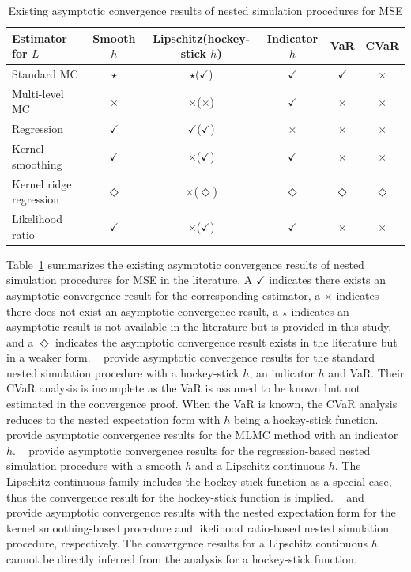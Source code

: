\begin{table}[ht]
    \centering
    \footnotesize
    \begin{tabular}{|l|c|c|c|c|c|}
    \hline
    \textbf{Estimator for} $L$ & \textbf{Smooth} $h$ & \textbf{Lipschitz}(\textbf{hockey-stick} $h$) & \textbf{Indicator} $h$ & \textbf{VaR} & \textbf{CVaR} \\
    \hline
    Standard MC & $\star$ & $\star$($\checkmark$) & $\checkmark$ & $\checkmark$ & $\times$ \\
    \hline
    Multi-level MC & $\times$ & $\times$($\times$) & $\checkmark$ & $\times$ & $\times$ \\
    \hline
    Regression & $\checkmark$ & $\checkmark$($\checkmark$) & $\times$ & $\times$ & $\times$ \\
    \hline
    Kernel smoothing & $\checkmark$ & $\times$($\checkmark$) & $\checkmark$ & $\times$ & $\times$ \\
    \hline
    Kernel ridge regression & $\Diamond$ & $\times$($\Diamond$) & $\Diamond$ & $\Diamond$ & $\Diamond$ \\
    \hline
    Likelihood ratio & $\checkmark$ & $\times$($\checkmark$) & $\checkmark$ & $\times$ & $\times$ \\
    \hline
    \end{tabular}
    \caption{Existing asymptotic convergence results of nested simulation procedures for MSE}
    \label{tab1:asymConv-mse}
\end{table}


Table~\ref{tab1:asymConv-mse} summarizes the existing asymptotic convergence results of nested simulation procedures for MSE in the literature.
A $\checkmark$ indicates there exists an asymptotic convergence result for the corresponding estimator,
a $\times$ indicates there does not exist an asymptotic convergence result, 
a $\star$ indicates an asymptotic result is not available in the literature but is provided in this study, and
a $\Diamond$ indicates the asymptotic convergence result exists in the literature but in a weaker form.
~\cite{gordy2010nested} provide asymptotic convergence results for the standard nested simulation procedure with a hockey-stick $h$, an indicator $h$ and VaR.
Their CVaR analysis is incomplete as the VaR is assumed to be known but not estimated in the convergence proof.
When the VaR is known, the CVaR analysis reduces to the nested expectation form with $h$ being a hockey-stick function.
~\cite{giles2019multilevel} provide asymptotic convergence results for the MLMC method with an indicator $h$.
~\cite{broadie2015risk} provide asymptotic convergence results for the regression-based nested simulation procedure with a smooth $h$ and a Lipschitz continuous $h$.
The Lipschitz continuous family includes the hockey-stick function as a special case, thus the convergence result for the hockey-stick function is implied.
~\cite{hong2017kernel} and~\cite{zhang2022sample} provide asymptotic convergence results with the nested expectation form for the kernel smoothing-based procedure and likelihood ratio-based nested simulation procedure, respectively.
The convergence results for a Lipschitz continuous $h$ cannot be directly inferred from the analysis for a hockey-stick function.

